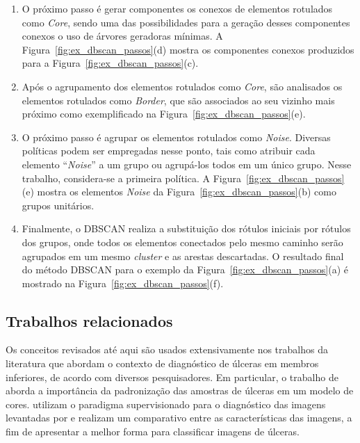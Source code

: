 \begin{enumerate}
    \item O próximo passo é gerar componentes os conexos de elementos rotulados como \textit{Core}, sendo uma das possibilidades para a geração desses componentes conexos o uso de árvores geradoras mínimas.
    A Figura~\ref{fig:ex_dbscan_passos}(d) mostra os componentes conexos produzidos para a Figura~\ref{fig:ex_dbscan_passos}(c).
    
    \item Após o agrupamento dos elementos rotulados como \textit{Core}, são analisados os elementos rotulados como \textit{Border}, que são associados ao seu vizinho mais próximo como exemplificado na Figura~\ref{fig:ex_dbscan_passos}(e).
    
    \item O próximo passo é agrupar os elementos rotulados como \textit{Noise}.
    Diversas políticas podem ser empregadas nesse ponto, tais como atribuir cada elemento ``\textit{Noise}'' a um grupo ou agrupá-los todos em um único grupo.
    Nesse trabalho, considera-se a primeira política.
    A Figura~\ref{fig:ex_dbscan_passos}(e) mostra os elementos \textit{Noise} da Figura~\ref{fig:ex_dbscan_passos}(b) como grupos unitários.
    
    \item Finalmente, o DBSCAN realiza a substituição dos rótulos iniciais por rótulos dos grupos, onde todos os elementos conectados pelo mesmo caminho serão agrupados em um mesmo \textit{cluster} e as arestas descartadas.
    O resultado final do método DBSCAN para o exemplo da Figura~\ref{fig:ex_dbscan_passos}(a) é mostrado na Figura~\ref{fig:ex_dbscan_passos}(f).
    
\end{enumerate}


\subsection{Trabalhos relacionados} 

Os conceitos revisados até aqui são usados extensivamente nos trabalhos da literatura que abordam o contexto de diagnóstico de úlceras em membros inferiores, de acordo com diversos pesquisadores.
Em particular, o trabalho de  aborda a importância da padronização das amostras de úlceras em um modelo de cores.
 utilizam o paradigma supervisionado para o diagnóstico das imagens levantadas por  e realizam um comparativo entre as características das imagens, a fim de apresentar a melhor forma para classificar imagens de úlceras.

